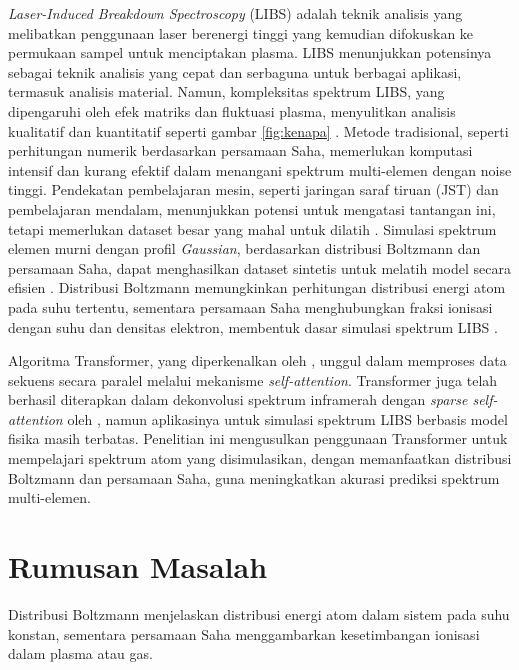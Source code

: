 \par \textit{Laser-Induced Breakdown Spectroscopy} (LIBS) adalah teknik analisis yang melibatkan penggunaan laser berenergi tinggi yang kemudian difokuskan ke permukaan sampel untuk menciptakan plasma. LIBS menunjukkan potensinya sebagai teknik analisis yang cepat dan serbaguna untuk berbagai aplikasi, termasuk analisis material. Namun, kompleksitas spektrum LIBS, yang dipengaruhi oleh efek matriks dan fluktuasi plasma, menyulitkan analisis kualitatif dan kuantitatif seperti gambar \ref{fig:kenapa} \parencite{gasior2023analysis}. Metode tradisional, seperti perhitungan numerik berdasarkan persamaan Saha, memerlukan komputasi intensif dan kurang efektif dalam menangani spektrum multi-elemen dengan noise tinggi. Pendekatan pembelajaran mesin, seperti jaringan saraf tiruan (JST) dan pembelajaran mendalam, menunjukkan potensi untuk mengatasi tantangan ini, tetapi memerlukan dataset besar yang mahal untuk dilatih \parencite{gasior2023analysis}. Simulasi spektrum elemen murni dengan profil \textit{Gaussian}, berdasarkan distribusi Boltzmann dan persamaan Saha, dapat menghasilkan dataset sintetis untuk melatih model secara efisien \parencite{pan-2024}. Distribusi Boltzmann memungkinkan perhitungan distribusi energi atom pada suhu tertentu, sementara persamaan Saha menghubungkan fraksi ionisasi dengan suhu dan densitas elektron, membentuk dasar simulasi spektrum LIBS \parencite{thorne1999}.

\par Algoritma Transformer, yang diperkenalkan oleh \cite{vaswani-2017}, unggul dalam memproses data sekuens secara paralel melalui mekanisme \textit{self-attention}. Transformer juga telah berhasil diterapkan dalam dekonvolusi spektrum inframerah dengan \textit{sparse self-attention} oleh \cite{gao2024}, namun aplikasinya untuk simulasi spektrum LIBS berbasis model fisika masih terbatas. Penelitian ini mengusulkan penggunaan Transformer untuk mempelajari spektrum atom yang disimulasikan, dengan memanfaatkan distribusi Boltzmann dan persamaan Saha, guna meningkatkan akurasi prediksi spektrum multi-elemen.


\section{Rumusan Masalah}
Distribusi Boltzmann menjelaskan distribusi energi atom dalam sistem pada suhu konstan, sementara persamaan Saha menggambarkan kesetimbangan ionisasi dalam plasma atau gas.

